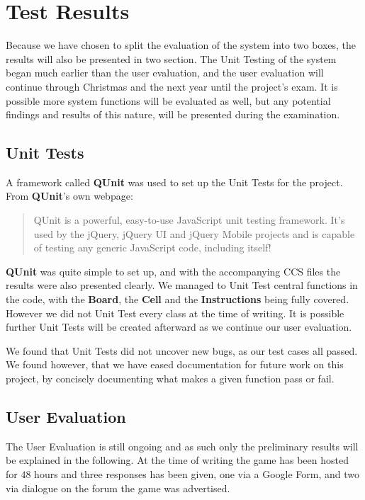 \section{Test Results}
\label{sec:testresults}

Because we have chosen to split the evaluation of the system into two boxes, the results will also be presented in two section. The Unit Testing of the system began much earlier than the user evaluation, and the user evaluation will continue through Christmas and the next year until the project's exam. It is possible more system functions will be evaluated as well, but any potential findings and results of this nature, will be presented during the examination.

\subsection{Unit Tests}

A framework called \textbf{QUnit} was used to set up the Unit Tests for the project.
From \textbf{QUnit}'s own webpage:

\begin{quotation}
QUnit is a powerful, easy-to-use JavaScript unit testing framework. It's used by the jQuery, jQuery UI and jQuery Mobile projects and is capable of testing any generic JavaScript code, including itself!\cite{qunit}
\end{quotation}

\textbf{QUnit} was quite simple to set up, and with the accompanying CCS files the results were also presented clearly. We managed to Unit Test central functions in the code, with the \textbf{Board}, the \textbf{Cell} and the \textbf{Instructions} being fully covered.  However we did not Unit Test every class at the time of writing. It is possible further Unit Tests will be created afterward as we continue our user evaluation.


We found that Unit Tests did not uncover new bugs, as our test cases all passed. We found however, that we have eased documentation for future work on this project, by concisely documenting what makes a given function pass or fail.


\subsection{User Evaluation}

The User Evaluation is still ongoing and as such only the preliminary results will be explained in the following. At the time of writing the game has been hosted for $48$ hours and three responses has been given, one via a Google Form, and two via dialogue on the forum the game was advertised.


